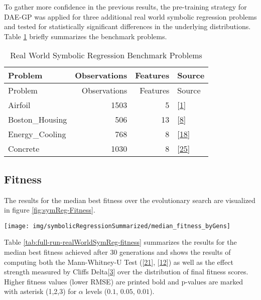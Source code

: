\documentclass[
  11pt,
]{article}
\let\origfigure\figure
\let\endorigfigure\endfigure
\renewenvironment{figure}[1][2] {
    \expandafter\origfigure\expandafter[H]
} {
    \endorigfigure
}
\begin{document}
To gather more confidence in the previous results, the pre-training strategy for DAE-GP was applied for three additional real world symbolic regression problems and tested for statistically significant differences in the underlying distributions. Table \ref{tab:full-run-realWorldSymReg-problems} briefly summarizes the benchmark problems.

\begin{longtable}[]{@{}lrrl@{}}
\caption{\label{tab:full-run-realWorldSymReg-problems}Real World Symbolic Regression Benchmark Problems}\tabularnewline
\toprule\noalign{}
Problem & Observations & Features & Source \\
\midrule\noalign{}
\endfirsthead
\toprule\noalign{}
Problem & Observations & Features & Source \\
\midrule\noalign{}
\endhead
\bottomrule\noalign{}
\endlastfoot
Airfoil & 1503 & 5 & {[}\protect\hyperlink{ref-AIRFOIL_DATASET}{1}{]} \\
Boston\_Housing & 506 & 13 & {[}\protect\hyperlink{ref-BOSTON_HOUSING_DATASET}{8}{]} \\
Energy\_Cooling & 768 & 8 & {[}\protect\hyperlink{ref-ENERGY_DATASET}{18}{]} \\
Concrete & 1030 & 8 & {[}\protect\hyperlink{ref-CONCRETE_DATASET}{25}{]} \\
\end{longtable}

\hypertarget{fitness}{%
\subsection{Fitness}\label{fitness}}

The results for the median best fitness over the evolutionary search are visualized in figure \ref{fig:symReg-Fitness}.

\begin{figure}[c]

{\centering \texttt{[image: img/symbolicRegressionSummarized/median\_fitness\_byGens]} 

}

\caption{Fitness over 30 Generations - Summary - Real World Symbolic Regression}\label{fig:symReg-Fitness}
\end{figure}

Table \ref{tab:full-run-realWorldSymReg-fitness} summarizes the results for the median best fitness achieved after 30 generations and shows the results of computing both the Mann-Whitney-U Test ({[}\protect\hyperlink{ref-mwu1}{21}{]}, {[}\protect\hyperlink{ref-mwu2}{12}{]}) as well as the effect strength measured by Cliffs Delta{[}\protect\hyperlink{ref-Cliff1993DominanceSO}{3}{]} over the distribution of final fitness scores. Higher fitness values (lower RMSE) are printed bold and p-values are marked with asterisk (1,2,3) for \(\alpha\) levels (\(0.1\), \(0.05\), \(0.01\)).
\end{document}
